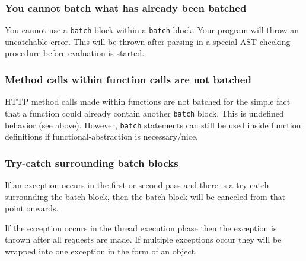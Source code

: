 \documentclass[12pt, letterpaper]{article}
\begin{document}
\subsubsection{You cannot batch what has already been batched}

You cannot use a \verb|batch| block within a \verb|batch| block. Your program will throw an uncatchable error. This will be thrown after parsing in a special AST checking procedure before evaluation is started.

\subsubsection{Method calls within function calls are not batched}

HTTP method calls made within functions are not batched for the simple fact that a function could already contain another \verb|batch| block. This is undefined behavior (see above). However, \verb|batch| statements can still be used inside function definitions if functional-abstraction is necessary/nice.

\subsubsection{Try-catch surrounding batch blocks}

If an exception occurs in the first or second pass and there is a try-catch surrounding the batch block, then the batch block will be canceled from that point onwards.

If the exception occurs in the thread execution phase then the exception is thrown after all requests are made. If multiple exceptions occur they will be wrapped into one exception in the form of an object.
\end{document}
